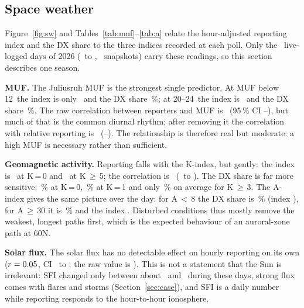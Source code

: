 \documentclass[10pt,a4paper]{article}
\begin{document}
\subsection{Space weather}
\label{sec:sw}
Figure~\ref{fig:sw} and Tables~\ref{tab:muf}--\ref{tab:a} relate the hour-adjusted reporting index and the DX share to the three indices recorded at each poll. Only the \swDays\ live-logged days of 2026 (\swFrom\ to \swTo, \swSnap\ snapshots) carry these readings, so this section describes one season.

\textbf{MUF.} The Juliusruh MUF is the strongest single predictor. At MUF below 12\MHz\ the index is only \mufIdxLow\ and the DX share \mufDxLow\,\%; at 20--24\MHz\ the index is \mufIdxMid\ and the DX share \mufDxMid\,\%. The raw correlation between reporters and MUF is \rMufRaw\ (95\,\% CI \rMufRawLo--\rMufRawHi), but much of that is the common diurnal rhythm; after removing it the correlation with relative reporting is \rMufRel\ (\rMufRelLo--\rMufRelHi). The relationship is therefore real but moderate: a high MUF is necessary rather than sufficient.

\textbf{Geomagnetic activity.} Reporting falls with the K-index, but gently: the index is \kIdxZero\ at K\,=\,0 and \kIdxFive\ at K\,$\ge$\,5; the correlation is \rKRel\ (\rKRelLo\ to \rKRelHi). The DX share is far more sensitive: \kDxZero\,\% at K\,=\,0, \kDxOne\,\% at K\,=\,1 and only \kDxHi\,\% on average for K\,$\ge$\,3. The A-index gives the same picture over the day: for A\,$<$\,8 the DX share is \aDxLow\,\% (index \aIdxLow), for A\,$\ge$\,30 it is \aDxHigh\,\% and the index \aIdxHigh. Disturbed conditions thus mostly remove the weakest, longest paths first, which is the expected behaviour of an auroral-zone path at 60\textdegree N.

\textbf{Solar flux.} The solar flux has no detectable effect on hourly reporting on its own ($r=0.05$, CI \rSfiRelLo\ to \rSfiRelHi; the raw value is \rSfiRaw). This is not a statement that the Sun is irrelevant: SFI changed only between about \sfiMin\ and \sfiMax\ during these days, strong flux comes with flares and storms (Section~\ref{sec:case}), and SFI is a daily number while reporting responds to the hour-to-hour ionosphere.




\end{document}
